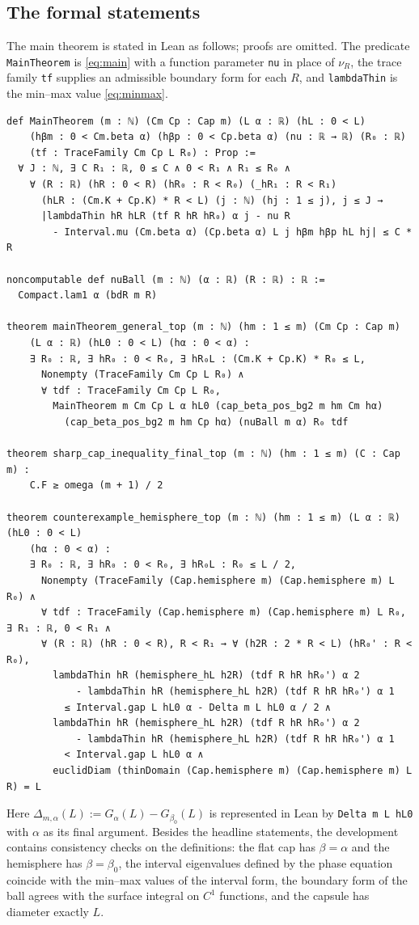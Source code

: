 \documentclass[11pt,a4paper]{article}
\numberwithin{equation}{section}
\theoremstyle{paperplain}
\theoremstyle{remark}
\newcommand{\lean}[1]{\texttt{#1}}
\begin{document}
\subsection{The formal statements}
The main theorem is stated in Lean as follows; proofs are omitted. The
predicate \lean{MainTheorem} is \eqref{eq:main} with a function parameter
\lean{nu} in place of $\nu_R$, the trace family \lean{tf} supplies an
admissible boundary form for each $R$, and \lean{lambdaThin} is the min--max
value \eqref{eq:minmax}.
\begin{Verbatim}[fontsize=\small,formatcom=\leanfont,frame=single,framesep=2mm]
def MainTheorem (m : ℕ) (Cm Cp : Cap m) (L α : ℝ) (hL : 0 < L)
    (hβm : 0 < Cm.beta α) (hβp : 0 < Cp.beta α) (nu : ℝ → ℝ) (R₀ : ℝ)
    (tf : TraceFamily Cm Cp L R₀) : Prop :=
  ∀ J : ℕ, ∃ C R₁ : ℝ, 0 ≤ C ∧ 0 < R₁ ∧ R₁ ≤ R₀ ∧
    ∀ (R : ℝ) (hR : 0 < R) (hR₀ : R < R₀) (_hR₁ : R < R₁)
      (hLR : (Cm.K + Cp.K) * R < L) (j : ℕ) (hj : 1 ≤ j), j ≤ J →
      |lambdaThin hR hLR (tf R hR hR₀) α j - nu R
        - Interval.mu (Cm.beta α) (Cp.beta α) L j hβm hβp hL hj| ≤ C * R

noncomputable def nuBall (m : ℕ) (α : ℝ) (R : ℝ) : ℝ :=
  Compact.lam1 α (bdR m R)

theorem mainTheorem_general_top (m : ℕ) (hm : 1 ≤ m) (Cm Cp : Cap m)
    (L α : ℝ) (hL0 : 0 < L) (hα : 0 < α) :
    ∃ R₀ : ℝ, ∃ hR₀ : 0 < R₀, ∃ hR₀L : (Cm.K + Cp.K) * R₀ ≤ L,
      Nonempty (TraceFamily Cm Cp L R₀) ∧
      ∀ tdf : TraceFamily Cm Cp L R₀,
        MainTheorem m Cm Cp L α hL0 (cap_beta_pos_bg2 m hm Cm hα)
          (cap_beta_pos_bg2 m hm Cp hα) (nuBall m α) R₀ tdf

theorem sharp_cap_inequality_final_top (m : ℕ) (hm : 1 ≤ m) (C : Cap m) :
    C.F ≥ omega (m + 1) / 2

theorem counterexample_hemisphere_top (m : ℕ) (hm : 1 ≤ m) (L α : ℝ) (hL0 : 0 < L)
    (hα : 0 < α) :
    ∃ R₀ : ℝ, ∃ hR₀ : 0 < R₀, ∃ hR₀L : R₀ ≤ L / 2,
      Nonempty (TraceFamily (Cap.hemisphere m) (Cap.hemisphere m) L R₀) ∧
      ∀ tdf : TraceFamily (Cap.hemisphere m) (Cap.hemisphere m) L R₀, ∃ R₁ : ℝ, 0 < R₁ ∧
      ∀ (R : ℝ) (hR : 0 < R), R < R₁ → ∀ (h2R : 2 * R < L) (hR₀' : R < R₀),
        lambdaThin hR (hemisphere_hL h2R) (tdf R hR hR₀') α 2
            - lambdaThin hR (hemisphere_hL h2R) (tdf R hR hR₀') α 1
          ≤ Interval.gap L hL0 α - Delta m L hL0 α / 2 ∧
        lambdaThin hR (hemisphere_hL h2R) (tdf R hR hR₀') α 2
            - lambdaThin hR (hemisphere_hL h2R) (tdf R hR hR₀') α 1
          < Interval.gap L hL0 α ∧
        euclidDiam (thinDomain (Cap.hemisphere m) (Cap.hemisphere m) L R) = L
\end{Verbatim}
Here $\Delta_{m,\alpha}(L):=G_\alpha(L)-G_{\beta_0}(L)$ is represented in
Lean by \lean{Delta m L hL0} with $\alpha$ as its final argument.
Besides the headline
statements, the development contains consistency checks on the definitions:
the flat cap has $\beta=\alpha$ and the hemisphere has $\beta=\beta_0$, the
interval eigenvalues defined by the phase equation coincide with the min--max
values of the interval form, the boundary form of the ball agrees with the
surface integral on $C^1$ functions, and the capsule has diameter exactly
$L$.
\end{document}
